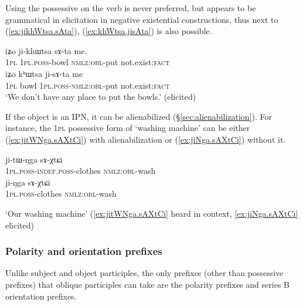 Using the possessive on the verb is never preferred, but appears to be grammatical in elicitation in negative existential constructions, thus next to (\ref{ex:jikhWtsa.sAta}),  (\ref{ex:khWtsa.jisAta}) is also possible.
\begin{exe}
\ex
\begin{xlist}
\ex \label{ex:jikhWtsa.sAta}
\gll iʑo ji-khɯtsa sɤ-ta me. \\
\textsc{1pl} \textsc{1pl}.\textsc{poss}-bowl  \textsc{nmlz}:\textsc{obl}-put not.exist:\textsc{fact} \\ 
\ex \label{ex:khWtsa.jisAta}
\gll iʑo kʰɯtsa ji-sɤ-ta me  \\
\textsc{1pl} bowl \textsc{1pl}.\textsc{poss}-\textsc{nmlz}:\textsc{obl}-put not.exist:\textsc{fact} \\ 
\glt `We  don't have any place to put the bowls.' (elicited)
\end{xlist}
\end{exe} 


If the object is an IPN, it can be alienabilized (§\ref{sec:alienabilization}). For instance, the \textsc{1pl} possessive form of  `washing machine' can be either (\ref{ex:jitWNga.sAXtCi}) with alienabilization or (\ref{ex:jiNga.sAXtCi}) without it.

\begin{exe}
\ex
\begin{xlist}
\ex \label{ex:jitWNga.sAXtCi}
\gll ji-tɯ-ŋga sɤ-χtɕi \\
\textsc{1pl}.\textsc{poss}-\textsc{indef}.\textsc{poss}-clothes \textsc{nmlz}:\textsc{obl}-wash \\
\ex \label{ex:jiNga.sAXtCi}
\gll ji-ŋga sɤ-χtɕi \\
\textsc{1pl}.\textsc{poss}-clothes \textsc{nmlz}:\textsc{obl}-wash \\
\end{xlist}
\glt `Our washing machine' (\ref{ex:jitWNga.sAXtCi} heard in context, \ref{ex:jiNga.sAXtCi} elicited)
\end{exe}

\subsubsection{Polarity and orientation prefixes} \label{sec:oblique.participle.orientation}
Unlike subject and object participles, the only prefixes (other than possessive prefixes) that oblique participles can take are the polarity prefixes and series B orientation prefixes.

